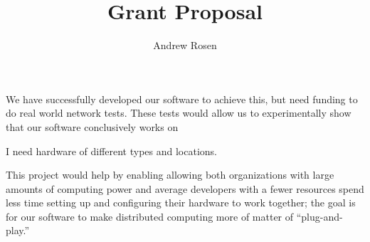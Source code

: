 \documentclass[12pt,a4paper]{article}
\author{Andrew Rosen}
\title{Grant Proposal}
\date{}
\begin{document}
\maketitle

We have successfully developed our software to achieve this, but need funding to do real world network tests. 
These tests would allow us to experimentally show that our software conclusively works on

I need hardware of different types and locations.

This project would help by enabling allowing  both organizations with large amounts of computing power and average developers with a fewer resources spend less time setting up and configuring their hardware to work together;  the goal is for our software to make distributed computing more of matter of ``plug-and-play.''
\end{document}
